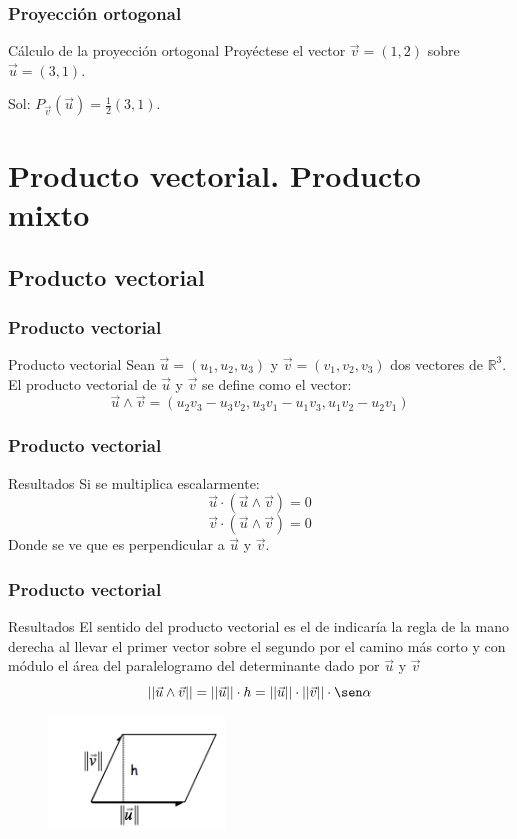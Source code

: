 \documentclass{beamer}
\begin{document}
\begin{frame}
  \frametitle{Proyecci\'on ortogonal}
    \begin{block}{C\'alculo de la proyecci\'on ortogonal}
Proy\'ectese el vector $\vec v = (1,2)$ sobre $\vec u = (3,1)$.
  \end{block}
  Sol: $P_{\vec v} (\vec u) = \frac{1}{2}(3,1)$.
\end{frame}



\section{Producto vectorial. Producto mixto}

\subsection{Producto vectorial}

\begin{frame}
  \frametitle{Producto vectorial}
    \begin{block}{Producto vectorial}
Sean $\vec u = (u_1,u_2,u_3)$ y $\vec v = (v_1,v_2,v_3)$ dos vectores de $\mathbb R^3$. El producto vectorial de $\vec u$ y $\vec v$ se define como el vector:
\[\vec u \wedge \vec v = (u_2v_3-u_3v_2,u_3v_1-u_1v_3,u_1v_2-u_2v_1)\]
  \end{block}
\end{frame}

\begin{frame}
  \frametitle{Producto vectorial}
    \begin{block}{Resultados}
Si se multiplica escalarmente:
\[\vec u \cdot (\vec u \wedge \vec v )  =0\]
\[\vec v \cdot (\vec u \wedge \vec v )  =0\]
Donde se ve que es perpendicular a $\vec u$ y $\vec v$.
\end{block}
\end{frame}

\begin{frame}
  \frametitle{Producto vectorial}
    \begin{block}{Resultados}
El sentido del producto vectorial es el de indicar\'ia la regla de la mano derecha al llevar el primer vector sobre el segundo por el camino m\'as corto y con m\'odulo el \'area del paralelogramo del determinante dado por $\vec u$ y $\vec v$
\[||\vec u \wedge \vec v|| = ||\vec u ||\cdot h = ||\vec u ||\cdot ||\vec v|| \cdot \sen \alpha \]
  \end{block}
  
  \begin{figure}[h]
    \label{fig:producto vectorial}
\centering
\includegraphics[height=3cm]{pte_vect}
\end{figure}

\end{frame}
\end{document}
